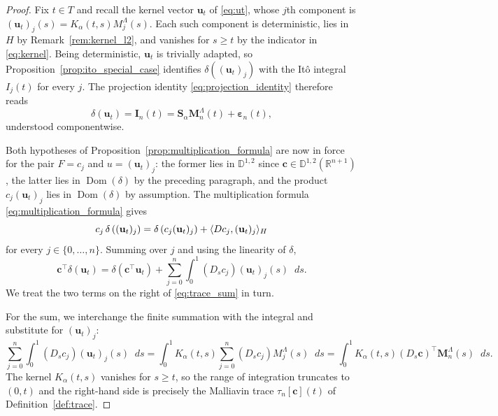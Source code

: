 \documentclass[11pt, a4paper]{article}
\theoremstyle{theoremstyle}
\theoremstyle{definitionstyle}
\newcommand{\dd}{\mathop{}\!d}
\DeclareMathOperator{\Dom}{\operatorname{Dom}}
\DeclarePairedDelimiter{\ip}{\langle}{\rangle}
\begin{document}
\begin{proof}
    Fix $t \in T$ and recall the kernel vector $\mathbf u_t$ of \eqref{eq:ut}, whose $j$th component is $(\mathbf u_t)_j(s) = K_\alpha(t, s)M_j^\Lambda(s)$. Each such component is deterministic, lies in $H$ by Remark~\ref{rem:kernel_l2}, and vanishes for $s \geq t$ by the indicator in \eqref{eq:kernel}. Being deterministic, $\mathbf u_t$ is trivially adapted, so Proposition~\ref{prop:ito_special_case} identifies $\delta((\mathbf u_t)_j)$ with the It\^o integral $I_j(t)$ for every $j$. The projection identity \eqref{eq:projection_identity} therefore reads
    \begin{equation}\label{eq:delta_ut}
        \delta(\mathbf u_t) = \mathbf I_n(t) = \mathbf S_\alpha \mathbf M_n^\Lambda(t) + \boldsymbol \varepsilon_n(t),
    \end{equation}
    understood componentwise.

    Both hypotheses of Proposition~\ref{prop:multiplication_formula} are now in force for the pair $F = c_j$ and $u = (\mathbf u_t)_j$: the former lies in $\mathbb D^{1,2}$ since $\mathbf c \in \mathbb D^{1,2}(\mathbb R^{n+1})$, the latter lies in $\Dom(\delta)$ by the preceding paragraph, and the product $c_j(\mathbf u_t)_j$ lies in $\Dom(\delta)$ by assumption. The multiplication formula \eqref{eq:multiplication_formula} gives
    \begin{equation}
        c_j\,\delta \left ( (\mathbf u_t)_j \right ) = \delta \left ( c_j(\mathbf u_t)_j \right ) + \ip{Dc_j, (\mathbf u_t)_j}_H
    \end{equation}
    for every $j \in \{0, \dots , n\}$. Summing over $j$ and using the linearity of $\delta$,
    \begin{equation}\label{eq:trace_sum}
        \mathbf c^\top \delta(\mathbf u_t) = \delta \left ( \mathbf c^\top \mathbf u_t \right ) + \sum_{j=0}^n \int_0^1 (D_sc_j)(\mathbf u_t)_j(s)\dd{s}.
    \end{equation}
    We treat the two terms on the right of \eqref{eq:trace_sum} in turn.

    For the sum, we interchange the finite summation with the integral and substitute for $(\mathbf u_t)_j$:
    \begin{equation}
        \sum_{j=0}^n \int_0^1 (D_sc_j)(\mathbf u_t)_j(s)\dd{s} = \int_0^1 K_\alpha(t, s)\sum_{j=0}^n (D_sc_j)M_j^\Lambda(s)\dd{s} = \int_0^1 K_\alpha(t, s)(D_s\mathbf c)^\top \mathbf M_n^\Lambda(s)\dd{s}.
    \end{equation}
    The kernel $K_\alpha(t, s)$ vanishes for $s \geq t$, so the range of integration truncates to $(0, t)$ and the right-hand side is precisely the Malliavin trace $\tau_n[\mathbf c](t)$ of Definition~\ref{def:trace}.


\end{proof}
\end{document}
